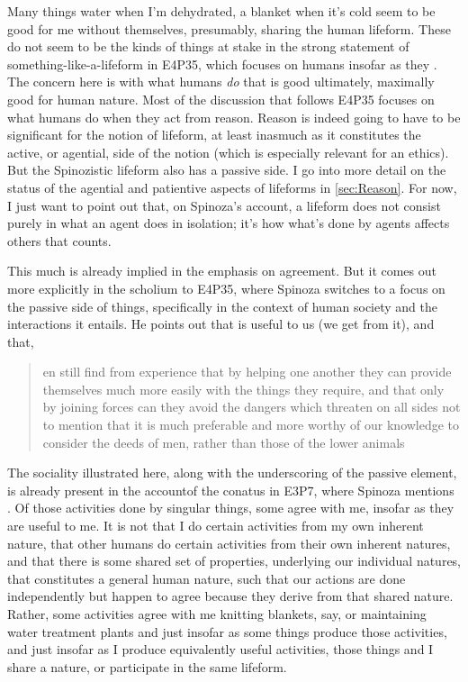 \documentclass{article}
\newcommand{\dash}{\unskip{—}}
\begin{document}
Many things \dash water when I'm dehydrated, a blanket when it's cold \dash seem to be good for me without themselves, presumably, sharing the human lifeform. These do not seem to be the kinds of things at stake in the strong statement of something-like-a-lifeform in E4P35, which focuses on humans insofar as they . The concern here is with what humans \emph{do} that is good \dash ultimately, maximally good \dash for human nature. Most of the discussion that follows E4P35 focuses on what humans do when they act from reason. Reason is indeed going to have to be significant for the notion of lifeform, at least inasmuch as it constitutes the active, or agential, side of the notion (which is especially relevant for an ethics). But the Spinozistic lifeform also has a passive side. I go into more detail on the status of the agential and patientive aspects of lifeforms in \cref{sec:Reason}. For now, I just want to point out that, on Spinoza's account, a lifeform does not consist purely in what an agent does in isolation; it's how what's done by agents affects others that counts.

This much is already implied in the emphasis on agreement. But it comes out more explicitly in the scholium to E4P35, where Spinoza switches to a focus on the passive side of things, specifically in the context of human society and the interactions it entails. He points out that  is useful to us (we get  from it), and that, \blockquote[][.]{en still find from experience that by helping one another they can provide themselves much more easily with the things they require, and that only by joining forces can they avoid the dangers which threaten on all sides \dash not to mention that it is much preferable and more worthy of our knowledge to consider the deeds of men, rather than those of the lower animals} The sociality illustrated here, along with the underscoring of the passive element, is already present in the accountof the conatus in E3P7, where Spinoza mentions . Of those activities done by singular things, some agree with me, insofar as they are useful to me. It is not that I do certain activities from my own inherent nature, that other humans do certain activities from their own inherent natures, and that there is some shared set of properties, underlying our individual natures, that constitutes a general human nature, such that our actions are done independently but happen to agree because they derive from that shared nature. Rather, some activities agree with me \dash knitting blankets, say, or maintaining water treatment plants \dash and just insofar as some things produce those activities, and just insofar as I produce equivalently useful activities, those things and I share a nature, or participate in the same lifeform.
\end{document}

